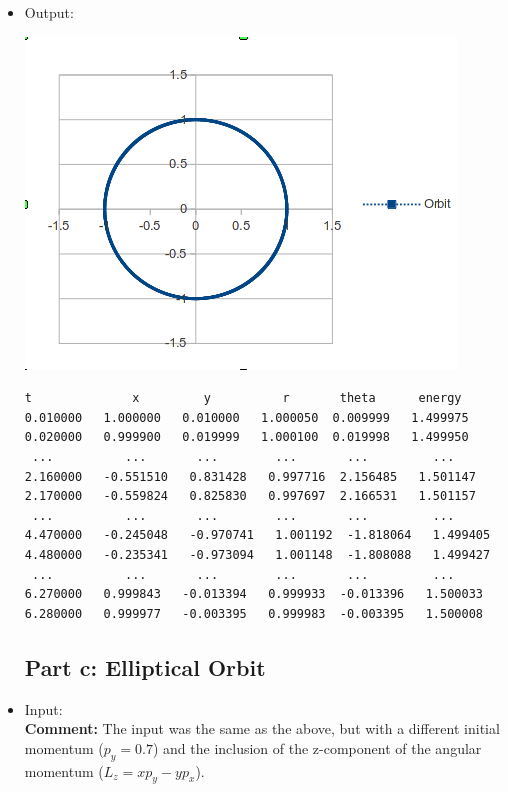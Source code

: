 \documentclass[10pt]{article}
\begin{document}
\begin{itemize}
\begin{verbatim}
                r = pow(x*x  + y*y, 0.5);      //changes coordinates to r
                en = .5 * (p_x*p_x + p_y*p_y) + 1 / r;           //energy
                t += h;
                fprintf(fout,"%f   %f   %f   %f  %f   %f\n", t, x, y, r, atan2(y, x), en);
        }
        fclose(fout);
}
\end{verbatim}
\item Output:
\begin{center}
\includegraphics[scale=.7]{CircularOrbit}
\end{center}
\begin{verbatim}
t              x         y          r       theta      energy
0.010000   1.000000   0.010000   1.000050  0.009999   1.499975
0.020000   0.999900   0.019999   1.000100  0.019998   1.499950
 ...          ...       ...        ...       ...         ...
2.160000   -0.551510   0.831428   0.997716  2.156485   1.501147
2.170000   -0.559824   0.825830   0.997697  2.166531   1.501157
 ...          ...       ...        ...       ...         ...
4.470000   -0.245048   -0.970741   1.001192  -1.818064   1.499405
4.480000   -0.235341   -0.973094   1.001148  -1.808088   1.499427
 ...          ...       ...        ...       ...         ...
6.270000   0.999843   -0.013394   0.999933  -0.013396   1.500033
6.280000   0.999977   -0.003395   0.999983  -0.003395   1.500008
\end{verbatim}

\subsection*{Part c: Elliptical Orbit}
\item Input: \\
\textbf{Comment:} The input was the same as the above, but with a different initial momentum ($p_y = 0.7$) and the inclusion of the z-component of the angular momentum ($L_z = xp_y - yp_x$).


\end{itemize}
\end{document}
